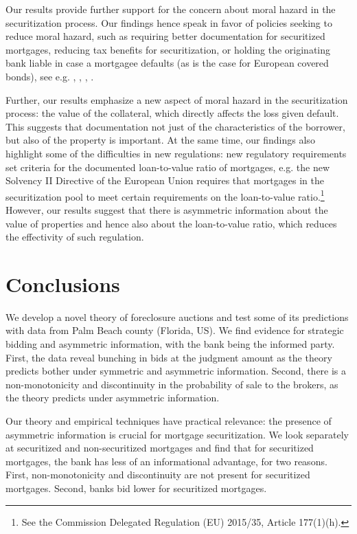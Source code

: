 \documentclass[11pt,twopage]{article}
\begin{document}
Our results provide
further support for the concern about moral hazard in the
securitization process. Our findings hence speak in favor of policies
seeking to reduce moral hazard, such as requiring better documentation
for securitized mortgages, reducing tax benefits for securitization, or holding the
originating bank liable in case a mortgagee defaults (as is the case
for European covered bonds), see e.g. \cite{keys2008did}, \cite{dewatripont2010balancing},
\cite{tirole2011illiquidity}, \cite{campbell2013mortgage}.

Further, our results emphasize a new aspect of moral hazard in the
securitization process: the value of the collateral, which directly affects 
the loss given default. This suggests that
documentation not just of the characteristics of the borrower, but
also of the property is important. At the same time, our findings also
highlight some of the difficulties in new regulations: new regulatory
requirements set criteria for the documented loan-to-value ratio of
mortgages, e.g. the new Solvency II Directive of the European Union
requires that mortgages in the securitization pool to meet certain
requirements on the loan-to-value ratio.\footnote{See the Commission
  Delegated Regulation (EU) 2015/35, Article 177(1)(h).} However, our
results suggest that there is asymmetric information about the value
of properties and hence also about the loan-to-value ratio, which
reduces the effectivity of such regulation.


\section{Conclusions}

We develop a novel theory of foreclosure auctions and test some of its
predictions with data from Palm Beach county (Florida, US). We find
evidence for strategic bidding and asymmetric information, with the
bank being the informed party. First, the data reveal bunching in bids
at the judgment amount as the theory predicts bother under symmetric
and asymmetric information. Second, there is a non-monotonicity and discontinuity in the
probability of sale to the brokers, as the theory predicts under
asymmetric information. 

Our theory and empirical techniques have practical relevance: the presence
of asymmetric information is crucial for mortgage securitization. We look
separately at securitized and non-securitized mortgages and find that
for securitized mortgages, the bank has less of an informational advantage,
for two reasons. First, non-monotonicity and discontinuity are not present
for securitized mortgages. Second, banks bid lower for securitized mortgages.
\end{document}
